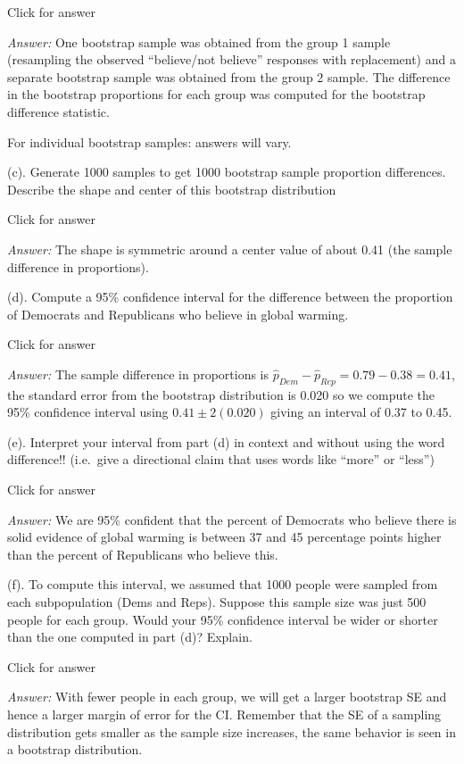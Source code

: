 \documentclass[
]{book}
\begin{document}
Click for answer

\emph{Answer:} One bootstrap sample was obtained from the group 1 sample (resampling the observed ``believe/not believe'' responses with replacement) and a separate bootstrap sample was obtained from the group 2 sample. The difference in the bootstrap proportions for each group was computed for the bootstrap difference statistic.

For individual bootstrap samples: answers will vary.

(c). Generate 1000 samples to get 1000 bootstrap sample proportion differences. Describe the shape and center of this bootstrap distribution

Click for answer

\emph{Answer:} The shape is symmetric around a center value of about 0.41 (the sample difference in proportions).

(d). Compute a 95\% confidence interval for the difference between the proportion of Democrats and Republicans who believe in global warming.

Click for answer

\emph{Answer:}
The sample difference in proportions is \(\hat{p}_{Dem} - \hat{p}_{Rep} = 0.79 - 0.38 = 0.41\), the standard error from the bootstrap distribution is 0.020 so we compute the 95\% confidence interval using \(0.41 \pm 2(0.020)\) giving an interval of 0.37 to 0.45.

(e). Interpret your interval from part (d) in context and without using the word difference!! (i.e.~give a directional claim that uses words like ``more'' or ``less'')

Click for answer

\emph{Answer:} We are 95\% confident that the percent of Democrats who believe there is solid evidence of global warming is between 37 and 45 percentage points higher than the percent of Republicans who believe this.

(f). To compute this interval, we assumed that 1000 people were sampled from each subpopulation (Dems and Reps). Suppose this sample size was just 500 people for each group. Would your 95\% confidence interval be wider or shorter than the one computed in part (d)? Explain.

Click for answer

\emph{Answer:} With fewer people in each group, we will get a larger bootstrap SE and hence a larger margin of error for the CI. Remember that the SE of a sampling distribution gets smaller as the sample size increases, the same behavior is seen in a bootstrap distribution.
\end{document}
